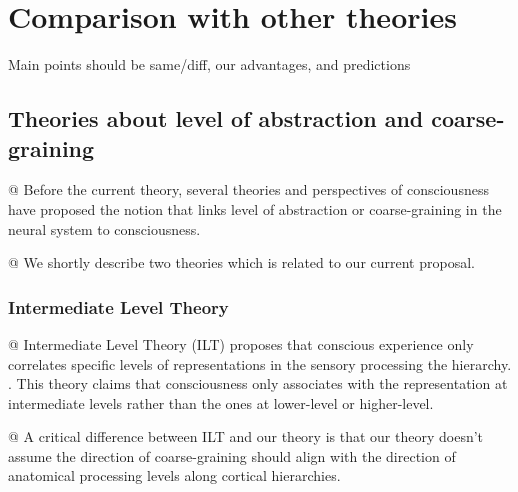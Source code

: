 \documentclass[utf8]{article}
\newenvironment{ants}
			{
			 \begin{easylist}[itemize]		
		 	}
			{
			\end{easylist}
			}
\newcommand{\ideaBox}[1]{
				\begin{tcolorbox}[hyphenationfix, width=12cm, colback=Thistle!50!white, flush right]
					#1
				\end{tcolorbox}
			}
\begin{document}
	

	\section{Comparison with other theories}
		\ideaBox{Main points should be same/diff, our advantages, and predictions}
		
	
		\subsection{Theories about level of abstraction and coarse-graining}
			\begin{ants}
				@ Before the current theory, several theories and perspectives of consciousness have proposed the notion that links level of abstraction or coarse-graining in the neural system to consciousness. 
				
				@ We shortly describe two theories which is  related to our current proposal. 
			\end{ants}
			
			
			\subsubsection{Intermediate Level Theory}
				\begin{ants}
					@ Intermediate Level Theory (ILT) proposes that conscious experience only correlates specific levels of representations in the sensory processing the hierarchy. \citep{prinz2007intermediate, jackendoff1987consciousness}. This theory claims that consciousness only associates with the representation at  intermediate levels rather than the ones at lower-level or higher-level. 
					
					
					@ A critical difference between ILT and our theory is that our theory doesn't assume the direction of coarse-graining should align with the direction of  anatomical processing levels along cortical hierarchies.
				\end{ants}
			
\end{document}
